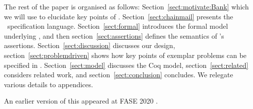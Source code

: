  
  
The rest of the paper is organised as follows:
Section~\ref{sect:motivate:Bank} 
 which we will use 
to elucidate key points of \Chainmail.
Section~\ref{sect:chainmail} presents the \Chainmail\ specification
language.  Section~\ref{sect:formal} introduces the formal model
underlying \Chainmail, and then section~\ref{sect:assertions} defines
the 
semantics of \Chainmail's assertions.
Section~\ref{sect:discussion}
discusses our design, section~\ref{sect:problemdriven} shows how key points of 
exemplar problems can be specified in \Chainmail. Section~\ref{sect:model} discusses the Coq model, section~\ref{sect:related} considers related
work, and section~\ref{sect:conclusion} concludes.
We relegate various details to appendices. 

An earlier version of this  appeared at FASE 2020 \cite{FASE}. 
